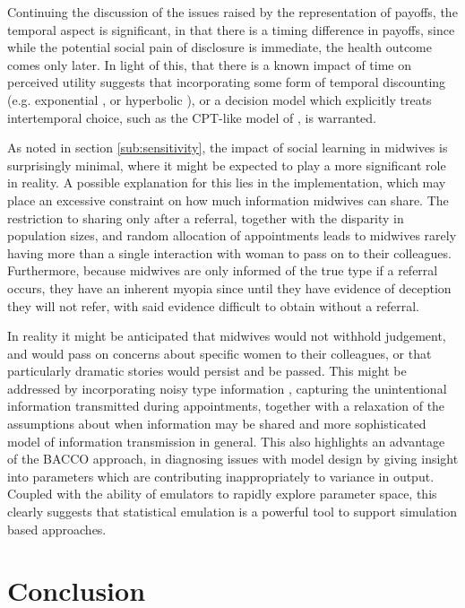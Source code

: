Continuing the discussion of the issues raised by the representation of payoffs, the temporal aspect is significant, in that there is a timing difference in payoffs, since while the potential social pain of disclosure is immediate, the health outcome comes only later. In light of this, that there is a known impact of time on perceived utility \citet{Thaler1981} suggests that incorporating some form of temporal discounting (e.g. exponential \citep{Samuelson1937}, or hyperbolic \citep{Ainslie1991}), or a decision model which explicitly treats intertemporal choice, such as the \ac{CPT}-like model of \citet{Loewenstein1992}, is warranted. 

As noted in section \ref{sub:sensitivity}, the impact of social learning in midwives is surprisingly minimal, where it might be expected to play a more significant role in reality. A possible explanation for this lies in the implementation, which may place an excessive constraint on how much information midwives can share. The restriction to sharing only after a referral, together with the disparity in population sizes, and random allocation of appointments leads to midwives rarely having more than a single interaction with woman to pass on to their colleagues. Furthermore, because midwives are only informed of the true type if a referral occurs, they have an inherent myopia since until they have evidence of deception they will not refer, with said evidence difficult to obtain without a referral.

In reality it might be anticipated that midwives would not withhold judgement, and would pass on concerns about specific women to their colleagues, or that particularly dramatic stories would persist and be passed. This might be addressed by incorporating noisy type information \citep{Feltovich2002}, capturing the unintentional information transmitted during appointments, together with a relaxation of the assumptions about when information may be shared and more sophisticated model of information transmission in general. This also highlights an advantage of the \ac{BACCO} approach, in diagnosing issues with model design by giving insight into parameters which are contributing inappropriately to variance in output. Coupled with the ability of emulators to rapidly explore parameter space, this clearly suggests that statistical emulation is a powerful tool to support simulation based approaches.

\section{Conclusion}
\label{sec:conclusion}

